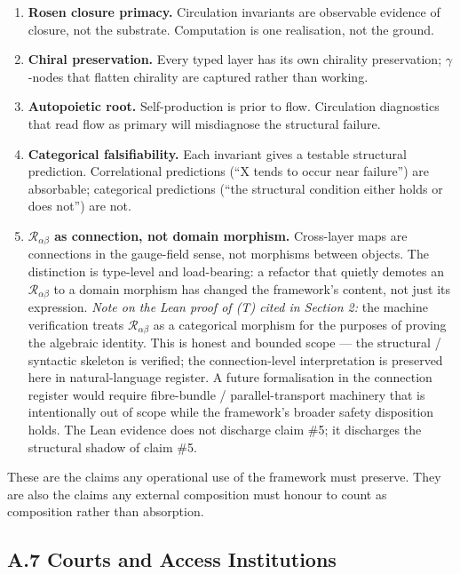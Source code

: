 \documentclass[
]{article}
\begin{document}
\begin{enumerate}
\def\labelenumi{\arabic{enumi}.}
\item
  \textbf{Rosen closure primacy.} Circulation invariants are
  observable evidence of closure, not the substrate. Computation is
  one realisation, not the ground.
\item
  \textbf{Chiral preservation.} Every typed layer has its own
  chirality preservation; \(\gamma\)-nodes that flatten chirality are
  captured rather than working.
\item
  \textbf{Autopoietic root.} Self-production is prior to flow.
  Circulation diagnostics that read flow as primary will misdiagnose
  the structural failure.
\item
  \textbf{Categorical falsifiability.} Each invariant gives a
  testable structural prediction. Correlational predictions
  (``X tends to occur near failure'') are absorbable; categorical
  predictions (``the structural condition either holds or does not'')
  are not.
\item
  \textbf{\(\mathcal{R}_{\alpha\beta}\) as connection, not domain
  morphism.} Cross-layer maps are connections in the gauge-field
  sense, not morphisms between objects. The distinction is type-level
  and load-bearing: a refactor that quietly demotes an
  \(\mathcal{R}_{\alpha\beta}\) to a domain morphism has changed the
  framework's content, not just its expression. \emph{Note on the
  Lean proof of (T) cited in Section 2:} the machine verification
  treats \(\mathcal{R}_{\alpha\beta}\) as a categorical morphism for
  the purposes of proving the algebraic identity. This is honest and
  bounded scope --- the structural / syntactic skeleton is verified;
  the connection-level interpretation is preserved here in
  natural-language register. A future formalisation in the connection
  register would require fibre-bundle / parallel-transport
  machinery that is intentionally out of scope while the framework's
  broader safety disposition holds. The Lean evidence does not
  discharge claim \#5; it discharges the structural shadow of
  claim \#5.
\end{enumerate}

These are the claims any operational use of the framework must
preserve. They are also the claims any external composition must
honour to count as composition rather than absorption.

\subsection{A.7 Courts and Access
Institutions}\label{a-7-courts-access-institutions}
\end{document}
